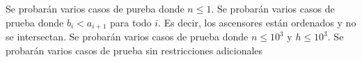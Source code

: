 \documentclass{oci}
\begin{document}
\begin{scoreDescription}
   Se probarán varios casos de pureba donde $n \leq 1$.
   Se probarán varios casos de prueba donde $b_i < a_{i+1}$ para todo $i$. Es decir, los
  ascensores están ordenados y no se intersectan.
   Se probarán varios casos de prueba donde $n \leq 10^3$ y $h \leq 10^3$.
   Se probarán varios casos de prueba sin restricciones adicionales
\end{scoreDescription}

\begin{sampleDescription}
\end{sampleDescription}
\end{document}
